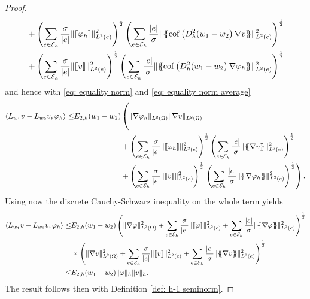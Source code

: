 \begin{proof}
\begin{align*}
			&+ \left( \sum_{e \in \edges} \frac {\sigma}{|e|}\LTwonormE{\jump {\varphi_h}}^2 \right)^{\frac 1 2}
			   \left( \sum_{e \in \edges} \frac {|e|} \sigma\LTwonormE{\average{\cofHessH{(w_1-w_2} \nabla v}}^2 \right)^{\frac 1 2} \\
			&+ \left( \sum_{e \in \edges} \frac {\sigma}{|e|}\LTwonormE{\jump v}^2 \right)^{\frac 1 2}
			\left( \sum_{e \in \edges} \frac {|e|} \sigma\LTwonormE{\average{\cofHessH{(w_1-w_2} \nabla \varphi_h}}^2 \right)^{\frac 1 2}
	\end{align*}
	and hence with \eqref{eq: equality norm} and \eqref{eq: equality norm average}
	\begin{align*}
		\bilin{L_{w_1}v- L_{w_2} v} {\varphi_h}
		\leq& \epsilonTwo{w_1 - w_2} 
			\left( \LTwonorm{\nabla \varphi_h} \LTwonorm {\nabla v} 
				\phantom{\left( \sum_{e \in \edges} \frac {|e|} \sigma\LTwonormE{\average{\nabla \varphi_h}}^2 \right)^{\frac 1 2}}
			 \right.\nonumber \\
			&\phantom{\epsilonTwo{w_1 - w_2}}+ \left( \sum_{e \in \edges} \frac {\sigma}{|e|}\LTwonormE{\jump {\varphi_h}}^2 \right)^{\frac 1 2}
			\left( \sum_{e \in \edges} \frac {|e|} \sigma\LTwonormE{\average{\nabla v}}^2 \right)^{\frac 1 2} \\
			&\phantom {\epsilonTwo{w_1 - w_2}}+ \left( \sum_{e \in \edges} \frac {\sigma}{|e|}\LTwonormE{\jump v}^2 \right)^{\frac 1 2}
			\left. \left( \sum_{e \in \edges} \frac {|e|} \sigma\LTwonormE{\average{\nabla \varphi_h}}^2 \right)^{\frac 1 2} \right).
	\end{align*}
	Using now the discrete Cauchy-Schwarz inequality on the whole term yields
	\begin{align*}
		\bilin{L_{w_1}v- L_{w_2} v} {\varphi_h} 
		\leq& \epsilonTwo{w_1 - w_2}
			\left( 
				\LTwonorm{\nabla \varphi}^2
					+ \sum\limits_{e \in \edges} \frac {\sigma} {|e|}\LTwonormE{\jump {\varphi}}^2
					+ \sum\limits_{e \in \edges} \frac {|e|} \sigma \LTwonormE{\average{\nabla \varphi}}^2
				\right)^{\frac 1 2} \nonumber \\
			&\times
			\left( 
				\LTwonorm{\nabla v}^2
					+\sum\limits_{e \in \edges} \frac {\sigma}{|e|}\LTwonormE{\jump {v}}^2
					+ \sum\limits_{e \in \edges} \frac {|e|} \sigma \LTwonormE{\average{\nabla v}}^2
			\right) ^{\frac 1 2} \nonumber \\
			\leq & \epsilonTwo{w_1 - w_2} \eNorm \varphi \eNorm v.
	\end{align*}
	The result follows then with Definition \ref{def: h-1 seminorm}.

\end{proof}
